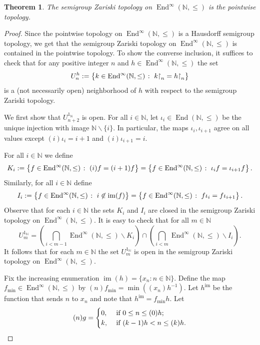 \documentclass[11pt]{amsart}
\makeatletter
\newtheorem{theorem}{Theorem}[section]
\theoremstyle{definition}
\newcommand{\N}{\mathbb N}
\newcommand{\Endd}{\operatorname{End}(\mathbb N, \leq)}
\newcommand{\im}{\operatorname{im}}
\newcommand{\makeset}[2]{\left\lbrace #1 \; \colon\;
 \begin{tabular}{@{}l@{}}
   #2
  \end{tabular}
  \right\rbrace}
\makeatother
\begin{document}
\begin{theorem}\label{magenta}
    The semigroup Zariski topology on \(\operatorname{End}^\infty(\N,\leq)\) is the pointwise topology.
\end{theorem}
\begin{proof}
Since the pointwise topology on $\operatorname{End}^\infty(\N,\leq)$ is a Hausdorff semigroup topology, we get that the semigroup Zariski topology on $\operatorname{End}^\infty(\N,\leq)$ is contained in the pointwise topology. To show the converse inclusion, it suffices to check that for any positive integer \(n\) and \(h\in \operatorname{End}^\infty(\N,\leq)\) the set
\[U_n^h:=\makeset{k\in \operatorname{End}^\infty(\N,\leq)}{\(k{\restriction}_n=h{\restriction}_n\)}\]
is a (not necessarily open) neighborhood of \(h\) with respect to the semigroup Zariski topology.

We first show that \(U_{n+2}^{1_\N}\) is open.
For all \(i\in \mathbb{N}\), let \(\iota_i\in \Endd\) be the unique injection with image \(\N\backslash \{i\}\). In particular, the maps \(\iota_i, \iota_{i+1}\) agree on all values except \((i)\iota_i=i+1\) and \((i)\iota_{i+1}=i\).

    For all \(i\in \N\) we define
    \[K_{i}:=\makeset{f\in \operatorname{End}^\infty(\N,\leq)}{\((i)f=(i+1)f\)}=\makeset{f\in \operatorname{End}^\infty(\N,\leq)}{$\iota_i f = \iota_{i+1} f$}.\]
     Similarly, for all \(i\in \N\) define
    \[I_{i}:=\makeset{f\in \operatorname{End}^\infty(\N,\leq)}{\(i\not \in \im(f)\)} =\makeset{f\in \operatorname{End}^\infty(\N,\leq)}{\(f \iota_i= f \iota_{i+1}\)}.\]
    Observe that for each $i\in\N$ the sets $K_i$ and $I_i$ are closed in the semigroup Zariski topology on $\operatorname{End}^\infty(\N,\leq)$.
      It is easy to check that  for all \(m\in \N\)\ \[U_{m}^{1_\N}=\left(\bigcap_{i<m-1}\operatorname{End}^\infty(\N,\leq)\backslash K_i\right) \cap\left( \bigcap_{i<m} \operatorname{End}^\infty(\N,\leq)\backslash I_i\right).\] 
      It follows that for each $m\in\N$ the set $U_{m}^{1_\N}$
    is open in the semigroup Zariski topology on $\operatorname{End}^\infty(\N,\leq)$.

Fix the increasing enumeration $\im(h)=\{x_n:n\in\N\}$. Define the map $f_{\min}\in \operatorname{End}^\infty(\N,\leq)$ by
$(n)f_{\min}=\min ((x_n)h^{-1})$. Let $h^{\im}$ be the function that sends $n$ to $x_n$ and note that \(h^{\im}=f_{\min}h\). 
Let $$(n)g=\begin{cases}
0,& \hbox{ if } 0\leq n\leq (0)h;\\
k,& \hbox{ if } (k-1)h<n\leq (k)h.
\end{cases}
$$   



\end{proof}
\end{document}
